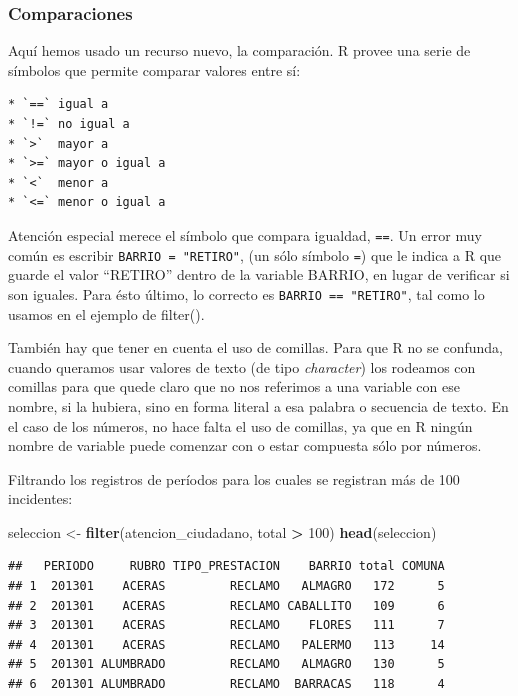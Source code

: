 \documentclass[]{book}
\newenvironment{Shaded}{\begin{snugshade}}{\end{snugshade}}
\newcommand{\KeywordTok}[1]{\textcolor[rgb]{0.13,0.29,0.53}{\textbf{#1}}}
\newcommand{\DecValTok}[1]{\textcolor[rgb]{0.00,0.00,0.81}{#1}}
\newcommand{\StringTok}[1]{\textcolor[rgb]{0.31,0.60,0.02}{#1}}
\newcommand{\OperatorTok}[1]{\textcolor[rgb]{0.81,0.36,0.00}{\textbf{#1}}}
\newcommand{\NormalTok}[1]{#1}
\begin{document}
\subsubsection{Comparaciones}\label{comparaciones}

Aquí hemos usado un recurso nuevo, la comparación. R provee una serie de
símbolos que permite comparar valores entre sí:

\begin{verbatim}
* `==` igual a 
* `!=` no igual a 
* `>`  mayor a 
* `>=` mayor o igual a 
* `<`  menor a 
* `<=` menor o igual a 
\end{verbatim}

Atención especial merece el símbolo que compara igualdad, \texttt{==}.
Un error muy común es escribir \texttt{BARRIO\ =\ "RETIRO"}, (un sólo
símbolo \texttt{=}) que le indica a R que guarde el valor ``RETIRO''
dentro de la variable BARRIO, en lugar de verificar si son iguales. Para
ésto último, lo correcto es \texttt{BARRIO\ ==\ "RETIRO"}, tal como lo
usamos en el ejemplo de filter().

También hay que tener en cuenta el uso de comillas. Para que R no se
confunda, cuando queramos usar valores de texto (de tipo
\emph{character}) los rodeamos con comillas para que quede claro que no
nos referimos a una variable con ese nombre, si la hubiera, sino en
forma literal a esa palabra o secuencia de texto. En el caso de los
números, no hace falta el uso de comillas, ya que en R ningún nombre de
variable puede comenzar con o estar compuesta sólo por números.

Filtrando los registros de períodos para los cuales se registran más de
100 incidentes:

\begin{Shaded}
\begin{Highlighting}[]
\NormalTok{seleccion <-}\StringTok{ }\KeywordTok{filter}\NormalTok{(atencion_ciudadano, total }\OperatorTok{>}\StringTok{ }\DecValTok{100}\NormalTok{)}
\KeywordTok{head}\NormalTok{(seleccion)}
\end{Highlighting}
\end{Shaded}

\begin{verbatim}
##   PERIODO     RUBRO TIPO_PRESTACION    BARRIO total COMUNA
## 1  201301    ACERAS         RECLAMO   ALMAGRO   172      5
## 2  201301    ACERAS         RECLAMO CABALLITO   109      6
## 3  201301    ACERAS         RECLAMO    FLORES   111      7
## 4  201301    ACERAS         RECLAMO   PALERMO   113     14
## 5  201301 ALUMBRADO         RECLAMO   ALMAGRO   130      5
## 6  201301 ALUMBRADO         RECLAMO  BARRACAS   118      4
\end{verbatim}
\end{document}
